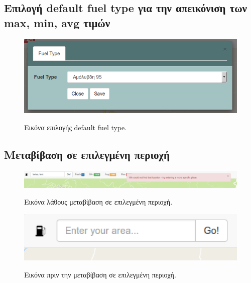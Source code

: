\subsection{Επιλογή default fuel type για την απεικόνιση των max, min, avg τιμών}

\begin{figure}[H]
  \caption{Εικόνα επιλογής default fuel type.}
  \centering
    \includegraphics[width=1\textwidth]{img/fuel-type.png}
    \label{fig:fuel-type}
\end{figure}

\subsection{Μεταβίβαση σε επιλεγμένη περιοχή}

\begin{figure}[H]
  \caption{Εικόνα λάθους μεταβίβαση σε επιλεγμένη περιοχή.}
  \centering
    \includegraphics[width=1\textwidth]{img/area-error.png}
    \label{fig:arrea-error}
\end{figure}

\begin{figure}[H]
  \caption{Εικόνα πριν την μεταβίβαση σε επιλεγμένη περιοχή.}
  \centering
    \includegraphics[width=1\textwidth]{img/pre-area.png}
    \label{fig:pre-area}
\end{figure}

